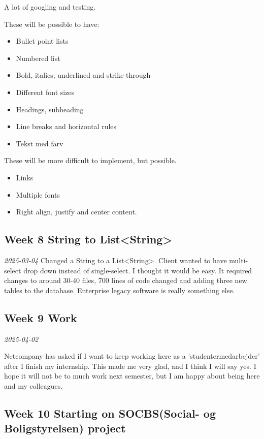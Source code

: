 \documentclass[../main.tex]{subfiles}
\begin{document}
A lot of googling and testing. 

These will be possible to have:
\begin{itemize}
    \item Bullet point lists
    \item Numbered list
    \item Bold, italics, underlined and strike-through
    \item Different font sizes
    \item Headings, subheading
    \item Line breaks and horizontal rules
    \item Tekst med farv
\end{itemize}

These will be more difficult to implement, but possible.

\begin{itemize}
    \item Links
    \item Multiple fonts
    \item Right align, justify and center content.
\end{itemize}


\subsection{Week 8 String to List<String>}
\noindent \textit{2025-03-04}
Changed a String to a List<String>. Client wanted to have multi-select drop down instead of single-select. I thought it would be easy. It required changes to around 30-40 files, 700 lines of code changed and adding three new tables to the database. Enterprise legacy software is really something else.

\subsection{Week 9 Work}
\noindent \textit{2025-04-02}

Netcompany has asked if I want to keep working here as a
'studentermedarbejder' after I finish my internship. This made me very
glad, and I think I will say yes. I hope it will not be to much work
next semester, but I am happy about being here and my colleagues. \\

\subsection{Week 10 Starting on SOCBS(Social- og Boligstyrelsen) project}
\end{document}
